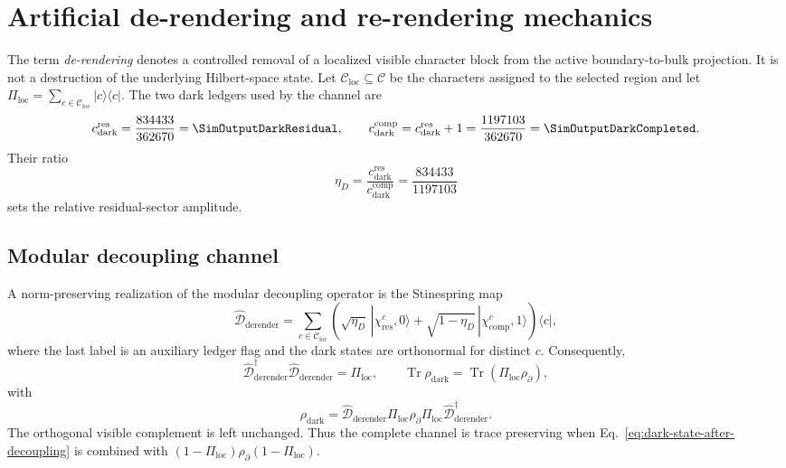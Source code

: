 \section{Artificial de-rendering and re-rendering mechanics}\label{sec:derendering}

The term \emph{de-rendering} denotes a controlled removal of a localized
visible character block from the active boundary-to-bulk projection.  It is
not a destruction of the underlying Hilbert-space state.  Let
\(\mathcal C_{\mathrm{loc}}\subseteq\mathcal C\) be the characters assigned to
the selected region and let
\(\Pi_{\mathrm{loc}}=\sum_{c\in\mathcal C_{\mathrm{loc}}}|c\rangle
\langle c|\).  The two dark ledgers used by the channel are
\begin{equation}
  c_{\mathrm{dark}}^{\mathrm{res}}
  =\frac{834433}{362670}
  =\SimOutputDarkResidual,
  \qquad
  c_{\mathrm{dark}}^{\mathrm{comp}}
  =c_{\mathrm{dark}}^{\mathrm{res}}+1
  =\frac{1197103}{362670}
  =\SimOutputDarkCompleted.
  \label{eq:dark-ledgers-derendering}
\end{equation}
Their ratio
\begin{equation}
  \eta_D
  =\frac{c_{\mathrm{dark}}^{\mathrm{res}}}
  {c_{\mathrm{dark}}^{\mathrm{comp}}}
  =\frac{834433}{1197103}
  \label{eq:derendering-channel-ratio}
\end{equation}
sets the relative residual-sector amplitude.

\subsection{Modular decoupling channel}

A norm-preserving realization of the modular decoupling operator is the
Stinespring map
\begin{equation}
  \widehat{\mathcal D}_{\mathrm{derender}}
  =\sum_{c\in\mathcal C_{\mathrm{loc}}}
  \left(
    \sqrt{\eta_D}\,
    |\chi_{\mathrm{res}}^c,0\rangle
    +\sqrt{1-\eta_D}\,
    |\chi_{\mathrm{comp}}^c,1\rangle
  \right)\langle c|,
  \label{eq:modular-decoupling-operator}
\end{equation}
where the last label is an auxiliary ledger flag and the dark states are
orthonormal for distinct \(c\).  Consequently,
\begin{equation}
  \widehat{\mathcal D}_{\mathrm{derender}}^{\dagger}
  \widehat{\mathcal D}_{\mathrm{derender}}
  =\Pi_{\mathrm{loc}},
  \qquad
  \operatorname{Tr}\rho_{\mathrm{dark}}
  =\operatorname{Tr}(\Pi_{\mathrm{loc}}\rho_{\partial}),
  \label{eq:derendering-isometry}
\end{equation}
with
\begin{equation}
  \rho_{\mathrm{dark}}
  =\widehat{\mathcal D}_{\mathrm{derender}}
  \Pi_{\mathrm{loc}}\rho_{\partial}\Pi_{\mathrm{loc}}
  \widehat{\mathcal D}_{\mathrm{derender}}^{\dagger}.
  \label{eq:dark-state-after-decoupling}
\end{equation}
The orthogonal visible complement is left unchanged.  Thus the complete
channel is trace preserving when Eq.~\eqref{eq:dark-state-after-decoupling}
is combined with
\((1-\Pi_{\mathrm{loc}})\rho_{\partial}(1-\Pi_{\mathrm{loc}})\).

